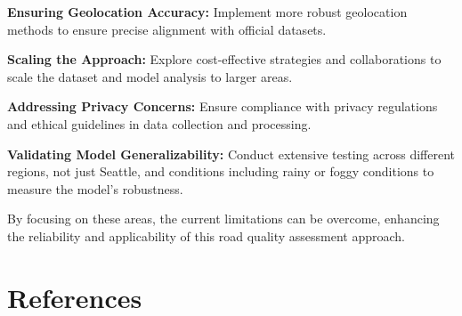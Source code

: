 \documentclass{article}
\begin{document}
\textbf{Ensuring Geolocation Accuracy:}
Implement more robust geolocation methods to ensure precise alignment with official datasets.

\textbf{Scaling the Approach:}
Explore cost-effective strategies and collaborations to scale the dataset and model analysis to larger areas.

\textbf{Addressing Privacy Concerns:}
Ensure compliance with privacy regulations and ethical guidelines in data collection and processing.

\textbf{Validating Model Generalizability:}
Conduct extensive testing across different regions, not just Seattle, and conditions including rainy or foggy conditions to measure the model's robustness.

By focusing on these areas, the current limitations can be overcome, enhancing the reliability and applicability of this road quality assessment approach.


\section*{References}
\end{document}
